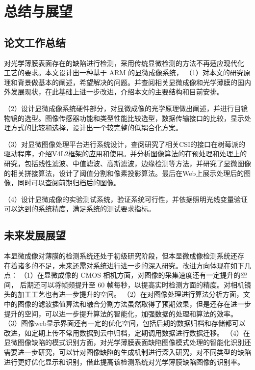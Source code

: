 \chapter{总结与展望}
\section{论文工作总结}
对光学薄膜表面存在的缺陷进行检测，采用传统显微检测的方法不再适应现代化 工艺的要求。本文设计出一种基于 ARM 的显微成像系统，
（1）对本文的研究原理和背景做基本的阐述，希望解决的问题。并查阅相关显微成像和光学薄膜的国内外发展现状，在此基础上进一步改进，介绍本文的主要结构和目前安排。

（2）设计显微成像系统硬件部分，对显微成像的光学原理做出阐述，并进行目镜物镜的选型。图像传感器功能和类型性能比较选型，数据传输接口的比较，显示处理方式的比较和选择，设计出一个较完整的低耦合化方案。

（3）对显微图像处理平台进行系统设计，查阅研究了相关CSI的接口在树莓派的驱动程序，介绍V4L2框架的应用和使用。并分析图像算法的在预处理和处理上的研究，包括线性滤波、中值滤波、高斯滤波，边缘检测等方法，并研究了显微图像的相关拼接算法，设计了阈值分割和像素投影算法。最后在Web上展示处理后的图像，同时可以查阅前期归档后的图像。

（4）设计显微成像的实验测试系统，验证系统可行性，并依据照明光线变量验证可以达到的系统精度，满足系统的测试要求指标。


\section{未来发展展望}
本显微成像对薄膜的检测系统还处于初级研究阶段，但本显微成像检测系统还存 在着诸多的不足，未来还需对系统进行进一步的深入研究。改进方向体现在如下几点： 
（1）在显微成像的 CMOS 相机方面，对图像的采集速度还有一定提升的空间， 后期还可以将帧频提升至 60 帧每秒，以提高实时检测方面的精度。对相机镜头的加工工艺也有进一步提升的空间。
（2）在对图像处理进行算法分析方面，文中的图像的滤波插值算法和融合分割方法虽然取得了预期效果，但是还存在进一步提升的空间，可以进一步提升算法的智能化，加强数据的处理和算法的效率。
（3）图像web显示界面还有一定的优化空间，包括后期的数据归档和存储都可以改进，如定期上传不常用数据到云中归档，定期调用数据进行数据迁移。
（4）在显微图像缺陷的模式识别方面，对光学薄膜表面缺陷图像模式处理的智能化识别还需要进一步研究，可以针对图像缺陷的生成机制进行深入研究，对不同类型的缺陷进行更好优化显示和识别，借此提高该检测系统对光学薄膜缺陷图像的识别率。 



